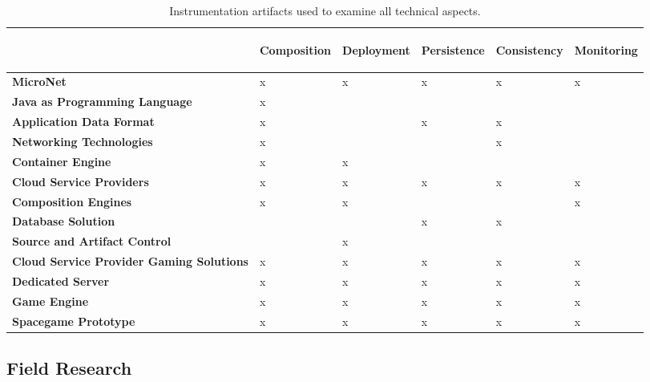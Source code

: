 \begin{table}
	\begin{center}
	  \begin{tabular}{ l | l | l | l | l | l | }
	    &\begin{turn}{90}\textbf{Composition}\end{turn}
	    &\begin{turn}{90}\textbf{Deployment}\end{turn}
	    &\begin{turn}{90}\textbf{Persistence}\end{turn}
	    &\begin{turn}{90}\textbf{Consistency}\end{turn}
	    &\begin{turn}{90}\textbf{Monitoring}\end{turn}
	    \\\hline
	    
	    
	    \textbf{MicroNet}&x&x&x&x&x\\\hline
	    \textbf{Java as Programming Language}&x&&&&\\\hline
	    \textbf{Application Data Format}&x&&x&x&\\\hline
	    \textbf{Networking Technologies}&x&&&x&\\\hline
	    \textbf{Container Engine}&x&x&&&\\\hline
	    \textbf{Cloud Service Providers}&x&x&x&x&x\\\hline
	    \textbf{Composition Engines}&x&x&&&x\\\hline
	    \textbf{Database Solution}&&&x&x&\\\hline
	    \textbf{Source and Artifact Control}&&x&&&\\\hline
	    \textbf{Cloud Service Provider Gaming Solutions}&x&x&x&x&x\\\hline
	    \textbf{Dedicated Server}&x&x&x&x&x\\\hline
	    \textbf{Game Engine}&x&x&x&x&x\\\hline
	    \textbf{Spacegame Prototype}&x&x&x&x&x\\\hline
	  \end{tabular}
	\end{center}
	\caption{Instrumentation artifacts used to examine all technical aspects.}
	\label{tab:instrumentation_aspects}
\end{table}


\subsection{Field Research}

